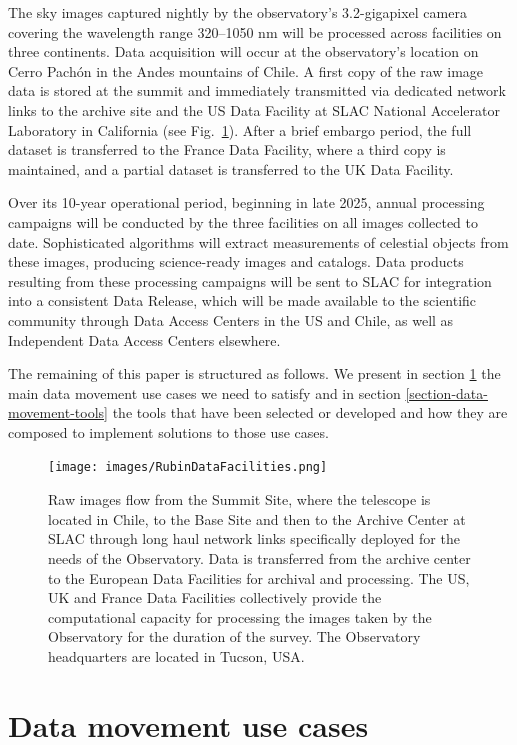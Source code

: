 \documentclass{webofc}
\begin{document}
The sky images captured nightly by the observatory's 3.2-gigapixel camera covering the wavelength range 320–1050 nm will be processed across facilities on three continents. Data acquisition will occur at the observatory's location on Cerro Pachón in the Andes mountains of Chile. A first copy of the raw image data is stored at the summit and immediately transmitted via dedicated network links to the archive site and the US Data Facility at SLAC National Accelerator Laboratory in California (see Fig.\ \ref{fig:data-facilities}). After a brief embargo period, the full dataset is transferred to the France Data Facility, where a third copy is maintained, and a partial dataset is transferred to the UK Data Facility.

Over its 10-year operational period, beginning in late 2025, annual processing campaigns will be conducted by the three facilities on all images collected to date. Sophisticated algorithms will extract measurements of celestial objects from these images, producing science-ready images and catalogs. Data products resulting from these processing campaigns will be sent to SLAC for integration into a consistent Data Release, which will be made available to the scientific community through Data Access Centers in the US and Chile, as well as Independent Data Access Centers elsewhere.

The remaining of this paper is structured as follows. We present in section \ref{section-data-movement-use-cases} the main data movement use cases we need to satisfy and in section \ref{section-data-movement-tools} the tools that have been selected or developed and how they are composed to implement solutions to those use cases.

\begin{figure}[h]
\texttt{[image: images/RubinDataFacilities.png]}
\caption{Raw images flow from the Summit Site, where the telescope is located in Chile, to the Base Site and then to the Archive Center at SLAC through long haul network links specifically deployed for the needs of the Observatory. Data is transferred from the archive center to the European Data Facilities for archival and processing. The US, UK and France Data Facilities collectively provide the computational capacity for processing the images taken by the Observatory for the duration of the survey. The Observatory headquarters are located in Tucson, USA.}
\label{fig:data-facilities}
\end{figure}

\section{Data movement use cases}
\label{section-data-movement-use-cases}
\end{document}
